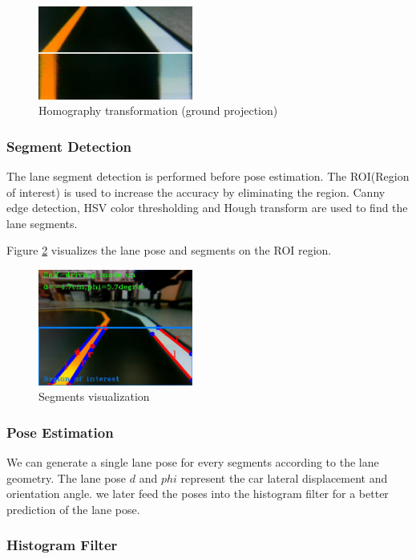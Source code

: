 \documentclass[conference]{IEEEtran}
\begin{document}
\begin{figure}	
	\centering
	\includegraphics[width=2in]{img/extrinsic.png}
	\caption{Homography transformation (ground projection)}
	\label{fig:extrinsic}
\end{figure}

\subsubsection{Segment Detection}

The lane segment detection is performed before pose estimation. The ROI(Region of interest) is used to increase the accuracy by eliminating the region. Canny edge detection, HSV color thresholding and Hough transform are used to find the lane segments.

Figure \ref{fig:lane_detect} visualizes the lane pose and segments on the ROI region.

\begin{figure}
	\centering
	\includegraphics[width=2in]{img/lane_detect.png}
	\caption{Segments visualization}
	\label{fig:lane_detect}
\end{figure}

\subsubsection{Pose Estimation}

We can generate a single lane pose for every segments according to the lane geometry. The lane pose $d$ and $phi$ represent the car lateral displacement and orientation angle. we later feed the poses into the histogram filter for a better prediction of the lane pose.

\subsubsection{Histogram Filter}
\end{document}
